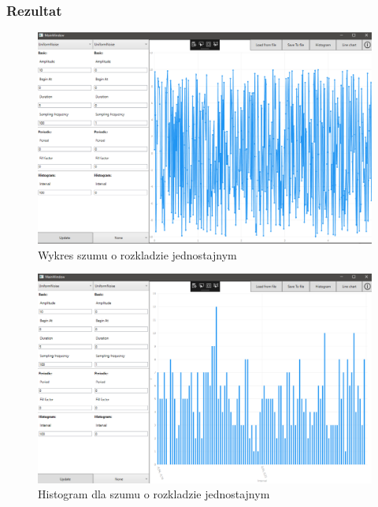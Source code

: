 \documentclass[12pt]{article}
\begin{document}
\subsubsection{Rezultat}

\begin{figure}[H]
 \centering
 \includegraphics[width=14cm]{images/uni1.PNG}
 \vspace{-0.3cm}
 \caption{Wykres szumu o rozkladzie jednostajnym}
 \label{gui}
\end{figure}

\begin{figure}[H]
 \centering
 \includegraphics[width=14cm]{images/uni1hist.PNG}
 \vspace{-0.3cm}
 \caption{Histogram dla szumu o rozkladzie jednostajnym}
 \label{gui}
\end{figure}
\end{document}
